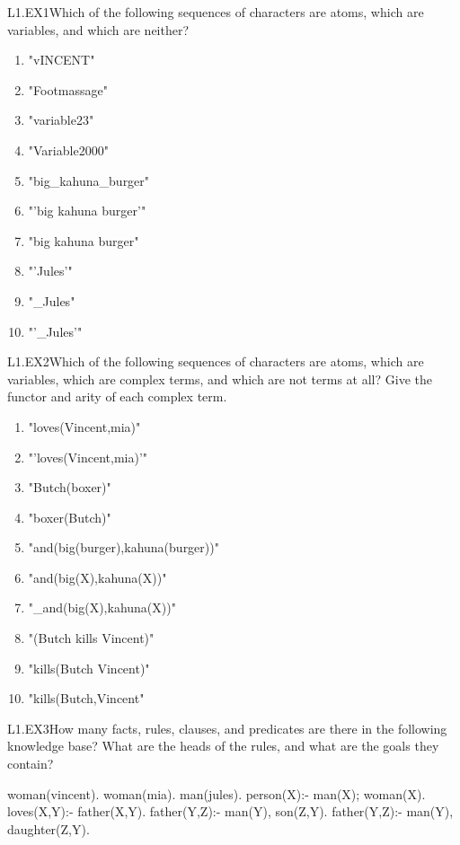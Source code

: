 \begin{LPNexercise}{L1.EX1}Which of the following sequences of
  characters are atoms, which are variables, and which are neither?

\begin{enumerate}
\item{}"vINCENT"
\item{}"Footmassage"
\item{}"variable23"
\item{}"Variable2000"
\item{}"big_kahuna_burger"
\item{}"'big kahuna burger'"
\item{}"big kahuna burger"
\item{}"'Jules'"
\item{}"_Jules"
\item{}"'_Jules'"
\end{enumerate}
\end{LPNexercise}

\begin{LPNexercise}{L1.EX2}Which of the following sequences of
  characters are atoms, which
  are variables, which are complex terms, and which are not terms at
  all?  Give the functor and arity of each complex term.

\begin{enumerate}
\item{}"loves(Vincent,mia)"
\item{}"'loves(Vincent,mia)'"
\item{}"Butch(boxer)"
\item{}"boxer(Butch)"
\item{}"and(big(burger),kahuna(burger))"
\item{}"and(big(X),kahuna(X))"
\item{}"_and(big(X),kahuna(X))"
\item{}"(Butch kills Vincent)"
\item{}"kills(Butch Vincent)"
\item{}"kills(Butch,Vincent"
\end{enumerate}
\end{LPNexercise}

\begin{LPNexercise}{L1.EX3}How many facts, rules, clauses, and predicates are there in the
following knowledge base?  What are the heads of the rules, and what
are the goals they contain?

\begin{LPNcodedisplay}
woman(vincent).
woman(mia).
man(jules).
person(X):- man(X); woman(X).
loves(X,Y):- father(X,Y).
father(Y,Z):- man(Y), son(Z,Y).
father(Y,Z):- man(Y), daughter(Z,Y).
\end{LPNcodedisplay}
\end{LPNexercise}

